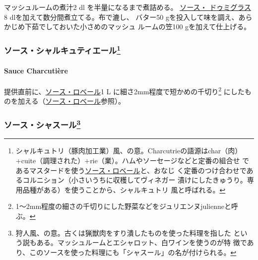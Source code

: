 \begin{recette}
マッシュルームの煮汁2\undemi{} dl を半量になるまで煮詰める。
\protect\hyperlink{sauce-demi-glace}{ソース・ ドゥミグラス}8
dlを加えて数分間煮立てる。布で漉し、 バター50
gを投入して味を調え、あらかじめ下茹でしておいた小さめのマッシュ
ルームの笠100 gを加えて仕上げる。

\maeaki

\hypertarget{ux30bdux30fcux30b9ux30b7ux30e3ux30ebux30adux30e5ux30c6ux30a3ux30a8ux30fcux30eb8}{%
\subsubsection[ソース・シャルキュティエール]{\texorpdfstring{ソース・シャルキュティエール\footnote{シャルキュトリ（豚肉加工業）風、の意。Charcutrieの語源はchar（肉）
  +cuite（調理された）+rie（業）。ハムやソーセージなどと定番の組合せ
  であるマスタードを使う\protect\hyperlink{sauce-robert}{ソース・ロベール}と、おなじ
  く定番のつけ合わせであるコルニション（小さいうちに収穫してヴィネガー
  漬けにしたきゅうり。専用品種がある）を使うことから、シャルキュトリ
  風と呼ばれる。}}{ソース・シャルキュティエール}}\label{ux30bdux30fcux30b9ux30b7ux30e3ux30ebux30adux30e5ux30c6ux30a3ux30a8ux30fcux30eb8}}

\hypertarget{sauce-charcutiere}{%
\paragraph{Sauce Charcutière}\label{sauce-charcutiere}}

 

提供直前に、\protect\hyperlink{sauce-robert}{ソース・ロベール}1 L
に細さ2mm程度で短かめの千切り\footnote{1〜2mm程度の細さの千切りにした野菜などをジュリエンヌjulienneと呼
  ぶ。}
にしたものを加える（\protect\hyperlink{sauce-robert}{ソース・ロベール}参照）。

\maeaki

\hypertarget{ux30bdux30fcux30b9ux30b7ux30e3ux30b9ux30fcux30eb10}{%
\subsubsection[ソース・シャスール]{\texorpdfstring{ソース・シャスール\footnote{狩人風、の意。古くは猟獣肉をすり潰したものを使った料理を指した
  という説もある。マッシュルームとエシャロット、白ワインを使うのが特
  徴であり、このソースを使った料理にも「シャスール」の名が付けられる。}}{ソース・シャスール}}\label{ux30bdux30fcux30b9ux30b7ux30e3ux30b9ux30fcux30eb10}}


\end{recette}
